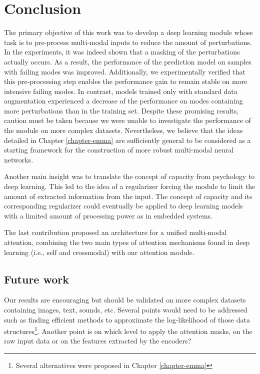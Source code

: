 \chapter{Conclusion} 
\label{chapter-conclusion} 

The primary objective of this work was to develop a deep learning module whose task is to pre-process multi-modal inputs to reduce the amount of perturbations. In the experiments, it was indeed shown that a masking of the perturbations actually occurs. As a result, the performance of the prediction model on samples with failing modes was improved. Additionally, we experimentally verified that this pre-processing step enables the performance gain to remain stable on more intensive failing modes. In contrast, models trained only with standard data augmentation experienced a decrease of the performance on modes containing more perturbations than in the training set. Despite these promising results, caution must be taken because we were unable to investigate the performance of the module on more complex datasets. Nevertheless, we believe that the ideas detailed in Chapter \ref{chapter-emma} are sufficiently general to be considered as a starting framework for the construction of more robust multi-modal neural networks.

Another main insight was to translate the concept of capacity from psychology to deep learning. This led to the idea of a regularizer forcing the module to limit the amount of extracted information from the input. The concept of capacity and its corresponding regularizer could eventually be applied to deep learning models with a limited amount of processing power as in embedded systems. 

The last contribution proposed an architecture for a unified multi-modal attention, combining the two main types of attention mechanisms found in deep learning (i.e., self and crossmodal) with our attention module.


\section{Future work}
Our results are encouraging but should be validated on more complex datasets containing images, text, sounds, etc. Several points would need to be addressed such as finding efficient methods to approximate the log-likelihood of those data structures\footnote{Several alternatives were proposed in Chapter \ref{chapter-emma}}. Another point is on which level to apply the attention masks, on the raw input data or on the features extracted by the encoders?

